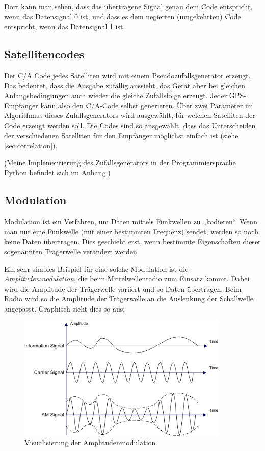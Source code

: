 \documentclass[12pt,a4paper]{scrartcl}
\begin{document}
Dort kann man sehen, dass das übertragene Signal genau dem Code entspricht, wenn das Datensignal 0 ist, und dass es dem negierten (umgekehrten) Code entspricht, wenn das Datensignal 1 ist.

\subsection{Satellitencodes}

Der C/A Code jedes Satelliten wird mit einem Pseudozufallsgenerator erzeugt. Das bedeutet, dass die Ausgabe zufällig aussieht, das Gerät aber bei gleichen Anfangsbedingungen auch wieder die gleiche Zufallsfolge erzeugt. Jeder GPS-Empfänger kann also den C/A-Code selbst generieren. Über zwei Parameter im Algorithmus dieses Zufallsgenerators wird ausgewählt, für welchen Satelliten der Code erzeugt werden soll. Die Codes sind so ausgewählt, dass das Unterscheiden der verschiedenen Satelliten für den Empfänger möglichst einfach ist (siehe \ref{sec:correlation}).

(Meine Implementierung des Zufallsgenerators in der Programmiersprache Python befindet sich im Anhang.)

\subsection{Modulation}

Modulation ist ein Verfahren, um Daten mittels Funkwellen zu „kodieren“.
Wenn man nur eine Funkwelle (mit einer bestimmten Frequenz) sendet, werden so noch keine Daten übertragen. Dies geschieht erst, wenn bestimmte Eigenschaften dieser sogenannten Trägerwelle verändert werden.

Ein sehr simples Beispiel für eine solche Modulation ist die \emph{Amplitudenmodulation}, die beim Mittelwellenradio zum Einsatz kommt. Dabei wird die Amplitude der Trägerwelle variiert und so Daten übertragen. Beim Radio wird so die Amplitude der Trägerwelle an die Auslenkung der Schallwelle angepasst. Graphisch sieht dies so aus:

\begin{figure}[H]
\centering
\includegraphics[width=0.9\textwidth]{img/Illustration_of_Amplitude_Modulation.png}
\caption{Visualisierung der Amplitudenmodulation\cite{commons_am}}
\label{fig:am}
\end{figure}
\end{document}
